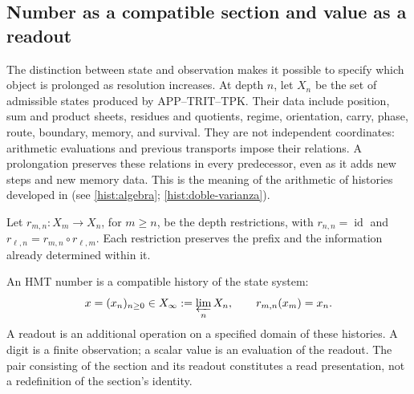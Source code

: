 
\subsection{Number as a compatible section and value as a readout}
\label{hist:seccion}

The distinction between state and observation makes it possible to specify which object is
prolonged as resolution increases. At depth \(n\), let \(X_n\)
be the set of admissible states produced by APP--TRIT--TPK. Their data
include position, sum and product sheets, residues and quotients, regime,
orientation, carry, phase, route, boundary, memory, and survival. They are not
independent coordinates: arithmetic evaluations and previous transports
impose their relations. A prolongation preserves these relations
in every predecessor, even as it adds new steps and new memory data.
This is the meaning of the arithmetic of histories developed in
(see \ref{hist:algebra}; \ref{hist:doble-varianza}).

Let \(r_{m,n}:X_m\to X_n\), for \(m\geq n\), be the depth
restrictions, with \(r_{n,n}=\operatorname{id}\) and
\(r_{\ell,n}=r_{m,n}\circ r_{\ell,m}\). Each restriction preserves the
prefix and the information already determined within it.

\begin{definition}
An HMT number is a compatible history of the state system:
\begin{equation}
 x=(x_n)_{n\geq0}\in X_\infty:=\varprojlim_n X_n,
 \qquad r_{m,n}(x_m)=x_n.
 \label{hist:limite-inverso}
\end{equation}
A readout is an additional operation on a specified domain of these
histories. A digit is a finite observation; a scalar value is an
evaluation of the readout. The pair consisting of the section and its readout constitutes
a read presentation, not a redefinition of the section's identity.
\end{definition}

